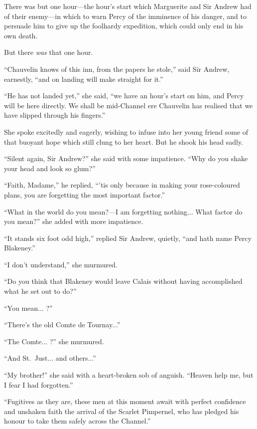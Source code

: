 \documentclass[paper=5.5in:8.5in,BCOR=7mm,twoside,DIV=calc,12pt,usegeometry,chapterprefix,endperiod,headings=big]{scrbook}
\begin{document}
There was but one hour---the hour's start which Marguerite and Sir Andrew had of their enemy---in which to warn Percy of the imminence of his danger, and to persuade him to give up the foolhardy expedition, which could only end in his own death.

But there \textit{was} that one hour.

\enquote{Chauvelin knows of this inn, from the papers he stole,} said Sir Andrew, earnestly, \enquote{and on landing will make straight for it.}

\enquote{He has not landed yet,} she said, \enquote{we have an hour's start on him, and Percy will be here directly. We shall be mid-Channel ere Chauvelin has realised that we have slipped through his fingers.}

She spoke excitedly and eagerly, wishing to infuse into her young friend some of that buoyant hope which still clung to her heart. But he shook his head sadly.

\enquote{Silent again, Sir Andrew?} she said with some impatience. \enquote{Why do you shake your head and look so glum?}

\enquote{Faith, Madame,} he replied, \enquote{’tis only because in making your rose-coloured plans, you are forgetting the most important factor.}

\enquote{What in the world do you mean?---I am forgetting nothing... What factor do you mean?} she added with more impatience.

\enquote{It stands six foot odd high,} replied Sir Andrew, quietly, \enquote{and hath name Percy Blakeney.}

\enquote{I don't understand,} she murmured.

\enquote{Do you think that Blakeney would leave Calais without having accomplished what he set out to do?}

\enquote{You mean... ?}

\enquote{There's the old Comte de Tournay...}

\enquote{The Comte... ?} she murmured.

\enquote{And St.~Just... and others...}

\enquote{My brother!} she said with a heart-broken sob of anguish. \enquote{Heaven help me, but I fear I had forgotten.}

\enquote{Fugitives as they are, these men at this moment await with perfect confidence and unshaken faith the arrival of the Scarlet Pimpernel, who has pledged his honour to take them safely across the Channel.}
\end{document}
